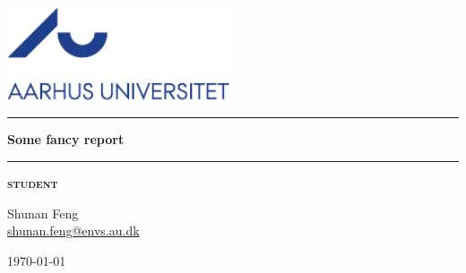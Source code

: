 
\begin{titlepage}
\begin{center}
\vspace{2cm}
\includegraphics[width=0.5\textwidth]{root/aulogo_dk_var1_blaa.pdf}~\\[1cm]
\vspace{2cm}


\hrule
\vspace{.5cm}
{ \huge \bfseries Some fancy report} %
\vspace{.5cm}

\hrule
\vspace{1.5cm}

\textsc{\textbf{student}}\\
\vspace{.5cm}
\centering

Shunan Feng\\
\href{mailto:shunan.feng@envs.au.dk}{shunan.feng@envs.au.dk}\\

\vspace{4cm}

\centering \today %
\end{center}
\end{titlepage}